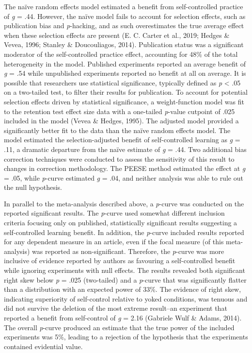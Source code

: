 \documentclass[
  english,
  man, donotrepeattitle,floatsintext]{apa7}
\begin{document}
The naïve random effects model estimated a benefit from self-controlled practice of \emph{g} = .44. However, the naïve model fails to account for selection effects, such as publication bias and \emph{p}-hacking, and as such overestimates the true average effect when these selection effects are present (E. C. Carter et al., 2019; Hedges \& Vevea, 1996; Stanley \& Doucouliagos, 2014). Publication status was a significant moderator of the self-controlled practice effect, accounting for 48\% of the total heterogeneity in the model. Published experiments reported an average benefit of \emph{g} = .54 while unpublished experiments reported no benefit at all on average. It is possible that researchers use statistical significance, typically defined as \emph{p} \textless{} .05 on a two-tailed test, to filter their results for publication. To account for potential selection effects driven by statistical significance, a weight-function model was fit to the retention test effect size data with a one-tailed \emph{p}-value cutpoint of .025 included in the model (Vevea \& Hedges, 1995). The adjusted model provided a significantly better fit to the data than the naïve random effects model. The model estimated the selection-adjusted benefit of self-controlled learning as \emph{g} = .11, a dramatic departure from the naïve estimate of \emph{g} = .44. Two additional bias correction techniques were conducted to assess the sensitivity of this result to changes in correction methodology. The PEESE method estimated the effect at \emph{g} = .05, while \emph{p}-curve estimated \emph{g} = .04, and neither analysis was able to rule out the null hypothesis.

In parallel to the meta-analysis described above, a \emph{p}-curve was conducted on the reported significant results. The \emph{p}-curve used somewhat different inclusion criteria focusing only on published, statistically significant results suggesting a self-controlled learning benefit. In addition, the \emph{p}-curve included results reported for any dependent measure in an article, even if the focal measure (of this meta-analysis) was reported as non-significant. Therefore, the \emph{p}-curve was more inclusive of evidence reported by authors as favouring a self-controlled benefit while ignoring experiments with null effects. The results revealed both significant right skew below \emph{p} = .025 (two-tailed) and a \emph{p}-curve that was significantly flatter than a distribution with an expected power of 33\%. The evidence of right skew, indicating superiority of self-control relative to yoked conditions, was tenuous and did not survive the deletion of the most extreme result--an experiment that reported a benefit from self-control of \emph{g} = 2.16 (Gabriele Wulf \& Adams, 2014). The overall \emph{p}-curve produced an estimate that the true power of the included experiments was 5\%, leading to a rejection of the hypothesis that the experiments contained evidential value.
\end{document}
